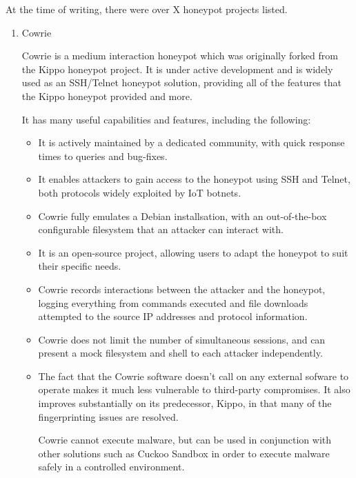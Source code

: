 At the time of writing, there were over X honeypot projects listed.

\begin{enumerate}

\item Cowrie

Cowrie is a medium interaction honeypot which was originally forked from the Kippo honeypot project. It is under active development and is widely used as an SSH/Telnet honeypot solution, providing all of the features that the Kippo honeypot provided and more. 

It has many useful capabilities and features, including the following:

\begin{itemize}
\item It is actively maintained by a dedicated community, with quick response times to queries and bug-fixes.

\item It enables attackers to gain access to the honeypot using SSH and Telnet, both protocols widely exploited by IoT botnets.

\item Cowrie fully emulates a Debian installsation, with an out-of-the-box configurable filesystem that an attacker can interact with.

\item It is an open-source project, allowing users to adapt the honeypot to suit their specific needs.

\item Cowrie records interactions between the attacker and the honeypot, logging everything from commands executed and file downloads attempted to the source IP addresses and protocol information.

\item Cowrie does not limit the number of simultaneous sessions, and can present a mock filesystem and shell to each attacker independently.

\item The fact that the Cowrie software doesn't call on any external sofware to operate makes it much less vulnerable to third-party compromises. It also improves substantially on its predecessor, Kippo, in that many of the fingerprinting issues are resolved.


Cowrie cannot execute malware, but can be used in conjunction with other solutions such as Cuckoo Sandbox in order to execute malware safely in a controlled environment.


\end{itemize}
\end{enumerate}
